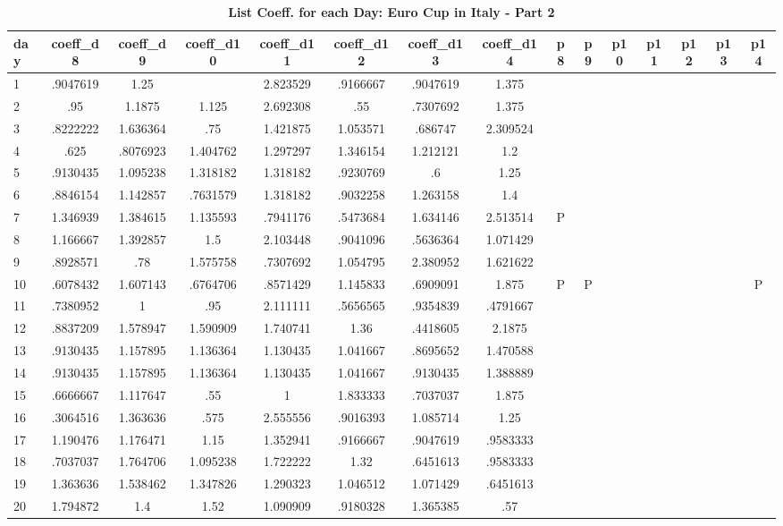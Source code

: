 \documentclass[a4paper,12pt]{article}
\begin{document}
\begin{landscape}
\begin{footnotesize}
\begin{center}
\begin{longtable}{lcccccccccccccc|}
\caption{\textbf{List Coeff. for each Day: Euro Cup in Italy - Part 2}\label{tab_it_2b}}
\hline
day&coeff\_d8&coeff\_d9&coeff\_d10&coeff\_d11&coeff\_d12&coeff\_d13&coeff\_d14&p8&p9&p10&p11&p12&p13&p14 \\ \hline
1&.9047619&1.25&&2.823529&.9166667&.9047619&1.375&&&&&&& \\
2&.95&1.1875&1.125&2.692308&.55&.7307692&1.375&&&&&&& \\
3&.8222222&1.636364&.75&1.421875&1.053571&.686747&2.309524&&&&&&& \\
4&.625&.8076923&1.404762&1.297297&1.346154&1.212121&1.2&&&&&&& \\
5&.9130435&1.095238&1.318182&1.318182&.9230769&.6&1.25&&&&&&& \\
6&.8846154&1.142857&.7631579&1.318182&.9032258&1.263158&1.4&&&&&&& \\
7&1.346939&1.384615&1.135593&.7941176&.5473684&1.634146&2.513514&P&&&&&& \\
8&1.166667&1.392857&1.5&2.103448&.9041096&.5636364&1.071429&&&&&&& \\
9&.8928571&.78&1.575758&.7307692&1.054795&2.380952&1.621622&&&&&&& \\
10&.6078432&1.607143&.6764706&.8571429&1.145833&.6909091&1.875&P&P&&&&&P \\
11&.7380952&1&.95&2.111111&.5656565&.9354839&.4791667&&&&&&& \\
12&.8837209&1.578947&1.590909&1.740741&1.36&.4418605&2.1875&&&&&&& \\
13&.9130435&1.157895&1.136364&1.130435&1.041667&.8695652&1.470588&&&&&&& \\
14&.9130435&1.157895&1.136364&1.130435&1.041667&.9130435&1.388889&&&&&&& \\
15&.6666667&1.117647&.55&1&1.833333&.7037037&1.875&&&&&&& \\
16&.3064516&1.363636&.575&2.555556&.9016393&1.085714&1.25&&&&&&& \\
17&1.190476&1.176471&1.15&1.352941&.9166667&.9047619&.9583333&&&&&&& \\
18&.7037037&1.764706&1.095238&1.722222&1.32&.6451613&.9583333&&&&&&& \\
19&1.363636&1.538462&1.347826&1.290323&1.046512&1.071429&.6451613&&&&&&& \\
20&1.794872&1.4&1.52&1.090909&.9180328&1.365385&.57&&&&&&& \\

\end{longtable}
\end{center}
\end{footnotesize}
\end{landscape}
\end{document}

